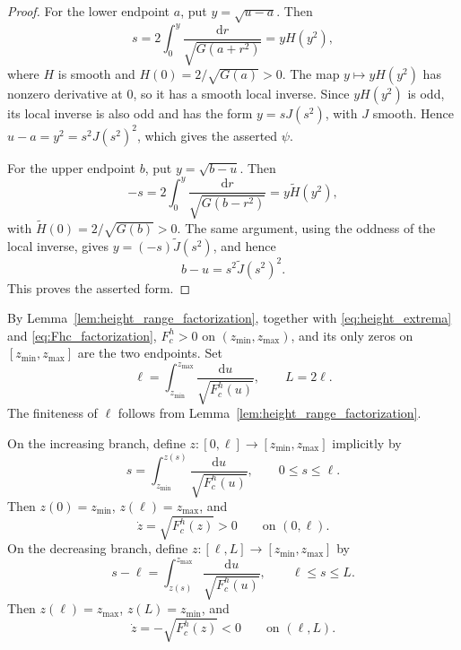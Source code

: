 \documentclass[a4paper,11pt]{amsart}
\numberwithin{equation}{section}
\theoremstyle{plain}
\newcommand{\dif}{\mathrm{d}}
\begin{document}
\begin{proof}
For the lower endpoint $a$, put $y=\sqrt{u-a}$.  Then
\[
    s=2\int_0^y \frac{\dif r}{\sqrt{G(a+r^2)}}=yH(y^2),
\]
where $H$ is smooth and $H(0)=2/\sqrt{G(a)}>0$.  The map
$y\mapsto yH(y^2)$ has nonzero derivative at $0$, so it has a smooth
local inverse. Since $yH(y^2)$ is odd, its local inverse is also odd and has
the form $y=sJ(s^2)$, with $J$ smooth. Hence
$u-a=y^2=s^2J(s^2)^2$, which gives the asserted $\psi$.

For the upper endpoint $b$, put $y=\sqrt{b-u}$.  Then
\[
    -s=2\int_0^y\frac{\dif r}{\sqrt{G(b-r^2)}}=y\widetilde H(y^2),
\]
with $\widetilde H(0)=2/\sqrt{G(b)}>0$. The same argument, using the
oddness of the local inverse, gives $y=(-s)\widetilde J(s^2)$, and hence
\[
    b-u=s^2\widetilde J(s^2)^2.
\]
This proves the asserted form.
\end{proof}

By Lemma~\ref{lem:height_range_factorization}, together with
\eqref{eq:height_extrema} and \eqref{eq:Fhc_factorization}, $F_{c}^{h}>0$ on
$(z_{\min},z_{\max})$, and its only zeros on
$[z_{\min},z_{\max}]$ are the two endpoints.
Set
\begin{equation}\label{eq:half_and_full_height_periods}
\ell
=
\int_{z_{\min}}^{z_{\max}}
\frac{\dif u}{\sqrt{F_{c}^{h}(u)}},
\qquad
L=2\ell.
\end{equation}
The finiteness of $\ell$ follows from
Lemma~\ref{lem:height_range_factorization}.

On the increasing branch, define $z:[0,\ell]\to[z_{\min},z_{\max}]$ implicitly by
\begin{equation}\label{eq:z_first_branch}
s=
\int_{z_{\min}}^{z(s)}
\frac{\dif u}{\sqrt{F_{c}^{h}(u)}},
\qquad
0\le s\le \ell.
\end{equation}
Then $z(0)=z_{\min}$, $z(\ell)=z_{\max}$, and
\[
\dot z=\sqrt{F_{c}^{h}(z)}>0
\qquad\text{on }(0,\ell).
\]
On the decreasing branch, define $z:[\ell,L]\to[z_{\min},z_{\max}]$ by
\begin{equation}\label{eq:z_second_branch}
s-\ell
=
\int_{z(s)}^{z_{\max}}
\frac{\dif u}{\sqrt{F_{c}^{h}(u)}},
\qquad
\ell\le s\le L.
\end{equation}
Then $z(\ell)=z_{\max}$, $z(L)=z_{\min}$, and
\[
\dot z=-\sqrt{F_{c}^{h}(z)}<0
\qquad\text{on }(\ell,L).
\]
\end{document}
